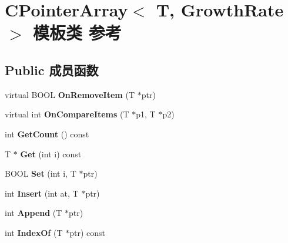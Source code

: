 \hypertarget{class_c_pointer_array}{}\section{C\+Pointer\+Array$<$ T, Growth\+Rate $>$ 模板类 参考}
\label{class_c_pointer_array}
\subsection*{Public 成员函数}
\begin{DoxyCompactItemize}
\item 
\mbox{\label{class_c_pointer_array_a9ccb5e03522b71955a35c70ce7414ada}} 
virtual B\+O\+OL {\bfseries On\+Remove\+Item} (T $\ast$ptr)
\item 
\mbox{\label{class_c_pointer_array_a6ac64ccbdf451837dc88fddc854acde7}} 
virtual int {\bfseries On\+Compare\+Items} (T $\ast$p1, T $\ast$p2)
\item 
\mbox{\label{class_c_pointer_array_a66c9865291f2c3e700bd5362887b743b}} 
int {\bfseries Get\+Count} () const
\item 
\mbox{\label{class_c_pointer_array_a27e3b5cc26b23d6bd4b77843f3a8c7fb}} 
T $\ast$ {\bfseries Get} (int i) const
\item 
\mbox{\label{class_c_pointer_array_a2a90a366eeb75df28aff63ff954be725}} 
B\+O\+OL {\bfseries Set} (int i, T $\ast$ptr)
\item 
\mbox{\label{class_c_pointer_array_a536c15acd1381b0a78fb688c3801b4ce}} 
int {\bfseries Insert} (int at, T $\ast$ptr)
\item 
\mbox{\label{class_c_pointer_array_ab6ce18a58cecce78ba1a97052abe73a7}} 
int {\bfseries Append} (T $\ast$ptr)
\item 
\mbox{\label{class_c_pointer_array_a225730437f91d88927287af69736654c}} 
int {\bfseries Index\+Of} (T $\ast$ptr) const
\item 
\mbox{\label{class_c_pointer_array_acedcdcd1991d0c6566aef29f7a998361}} 

\end{DoxyCompactItemize}

